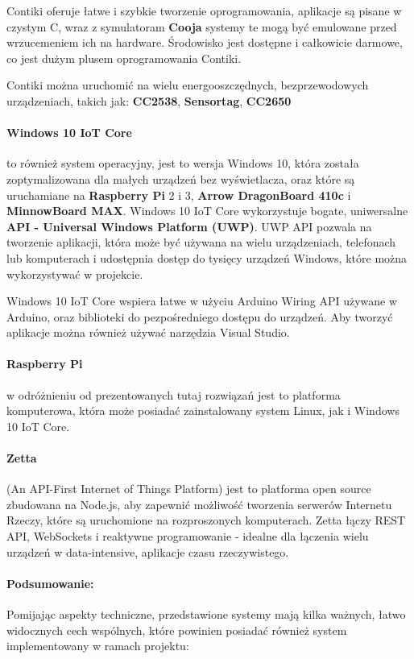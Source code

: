 Contiki oferuje łatwe i szybkie tworzenie oprogramowania, aplikacje są pisane w czystym C, wraz z symulatoram \textbf{Cooja} systemy te mogą być emulowane przed wrzucemeniem ich na hardware. Środowisko jest dostępne i całkowicie darmowe, co jest dużym plusem oprogramowania Contiki.

Contiki można uruchomić na wielu energooszczędnych, bezprzewodowych urządzeniach, takich jak\cite{contiki-hardware-www}: \textbf{CC2538}, \textbf{Sensortag}, \textbf{CC2650}

\paragraph{Windows 10 IoT Core}\cite{windows-iot-www} to również system operacyjny, jest to wersja Windows 10, która została zoptymalizowana dla małych urządzeń bez wyświetlacza, oraz które są uruchamiane na \textbf{Raspberry Pi} 2 i 3, \textbf{Arrow DragonBoard 410c} i \textbf{MinnowBoard MAX}. 
Windows 10 IoT Core wykorzystuje bogate, uniwersalne \textbf{API - Universal Windows Platform (UWP)}. UWP API pozwala na tworzenie aplikacji, która może być używana na wielu urządzeniach, telefonach lub komputerach i udostępnia dostęp do tysięcy urządzeń Windows, które można wykorzystywać w projekcie.

Windows 10 IoT Core wspiera łatwe w użyciu Arduino Wiring API używane w Arduino, oraz biblioteki do pezpośredniego dostępu do urządzeń. Aby tworzyć aplikacje można również używać narzędzia Visual Studio.


\paragraph{Raspberry Pi}\cite{raspberry-www} w odróżnieniu od prezentowanych tutaj rozwiązań jest to platforma komputerowa, która może posiadać zainstalowany system Linux, jak i Windows 10 IoT Core.

\paragraph{Zetta}\cite{zetta-www} (An API-First Internet of Things Platform) jest to platforma open source zbudowana na Node.js, aby zapewnić możliwość tworzenia serwerów Internetu Rzeczy, które są uruchomione na rozproszonych komputerach. Zetta łączy REST API, WebSockets i reaktywne programowanie - idealne dla łączenia wielu urządzeń w data-intensive, aplikacje czasu rzeczywistego.

\paragraph{Podsumowanie:} Pomijając aspekty techniczne, przedstawione systemy mają kilka ważnych, łatwo widocznych cech wspólnych, które powinien posiadać również system implementowany w ramach projektu:

